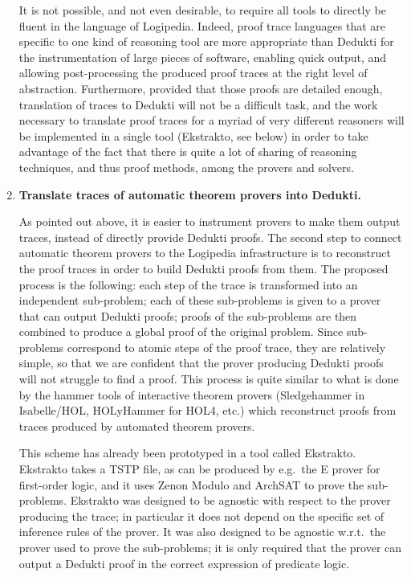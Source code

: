 \begin{enumerate}[\bf(a)]
It is not possible, and not even desirable, to require all tools to
directly be fluent in the language of Logipedia.  Indeed, proof trace
languages that are specific to one kind of reasoning tool are more
appropriate than Dedukti for the instrumentation of large pieces of
software, enabling quick output, and allowing post-processing the
produced proof traces at the right level of abstraction.
Furthermore, provided that those proofs are detailed enough,
translation of traces to Dedukti will not be a difficult task, and
the work necessary to translate proof traces for a myriad of very
different reasoners will be implemented in a single tool (Ekstrakto,
see below) in order to take advantage of the fact that there is quite a lot of
sharing of reasoning techniques, and thus proof methods, among the
provers and solvers.

\item{\bf Translate traces of automatic theorem provers into Dedukti.}
  
As pointed out above, it is easier to instrument
provers to make them output traces, instead of directly provide
Dedukti proofs. The second step to connect automatic theorem provers
to the Logipedia infrastructure is to reconstruct the proof traces in
order to build Dedukti proofs from them. The proposed process is the
following: each step of the trace is transformed into an independent
sub-problem; each of these sub-problems is given to a prover that can
output Dedukti proofs; proofs of the sub-problems are then combined to
produce a global proof of the original problem.  Since sub-problems
correspond to atomic steps of the proof trace, they are relatively
simple, so that we are confident that the prover producing Dedukti
proofs will not struggle to find a proof. This process is quite
similar to what is done by the hammer tools of interactive theorem
provers (Sledgehammer in Isabelle/HOL, HOLyHammer for HOL4, etc.)
which reconstruct proofs from traces produced by automated theorem
provers.

This scheme has already been prototyped in a tool called
Ekstrakto. Ekstrakto takes a TSTP file, as can be produced by
e.g.\ the E prover for first-order logic, and it uses Zenon Modulo and
ArchSAT to prove the sub-problems. Ekstrakto was designed to be
agnostic with respect to the prover producing the trace; in particular
it does not depend on the specific set of inference rules of the
prover. It was also designed to be agnostic w.r.t.\ the prover used to
prove the sub-problems; it is only required that the prover can output
a Dedukti proof in the correct expression of predicate logic.


\end{enumerate}
